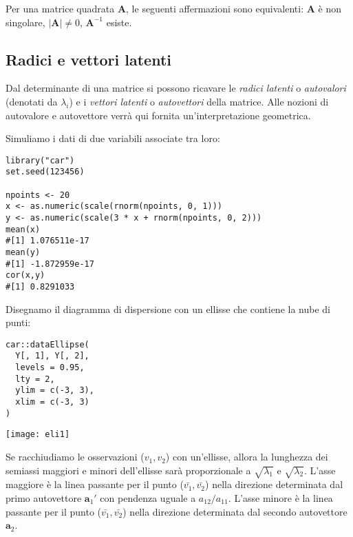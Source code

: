  Per una matrice quadrata $\boldsymbol{A}$, le seguenti
affermazioni sono equivalenti:
 $\boldsymbol{A}$ {\`e} non singolare,
    $|\boldsymbol{A}|\neq 0$,
   $\boldsymbol{A}^{-1}$ esiste.



\subsection{Radici e vettori latenti}

Dal determinante di una matrice si possono ricavare le \emph{radici latenti} o \emph{autovalori} (denotati da $\lambda_i$) e i \emph{vettori latenti} o \emph{autovettori} della matrice. Alle nozioni di autovalore e autovettore verrà qui fornita un'interpretazione geometrica.

Simuliamo i dati di due variabili associate tra loro:

\begin{lstlisting}
library("car")
set.seed(123456)

npoints <- 20
x <- as.numeric(scale(rnorm(npoints, 0, 1)))
y <- as.numeric(scale(3 * x + rnorm(npoints, 0, 2)))
mean(x)
#[1] 1.076511e-17
mean(y)
#[1] -1.872959e-17
cor(x,y)
#[1] 0.8291033
\end{lstlisting}
Disegnamo il diagramma di dispersione con un ellisse che contiene la nube di punti:
\begin{lstlisting}
car::dataEllipse(
  Y[, 1], Y[, 2],
  levels = 0.95,
  lty = 2,
  ylim = c(-3, 3),
  xlim = c(-3, 3)
)
\end{lstlisting}

\begin{center}
 \texttt{[image: eli1]}
\end{center}
Se racchiudiamo le osservazioni ($v_1, v_2$) con un'ellisse, allora la lunghezza dei semiassi maggiori e minori dell'ellisse sarà proporzionale a $\sqrt{\lambda_1}$ e $\sqrt{\lambda_2}$.
L'asse maggiore è la linea passante per il punto ($\bar{v_1}, \bar{v_2}$) nella direzione determinata dal primo autovettore $\boldsymbol{a}_1'$ con pendenza uguale a $a_{12}/a_{11}$. 
L'asse minore è la linea passante per il punto ($\bar{v_1}, \bar{v_2}$) nella direzione determinata dal secondo autovettore $\boldsymbol{a}_2$.

